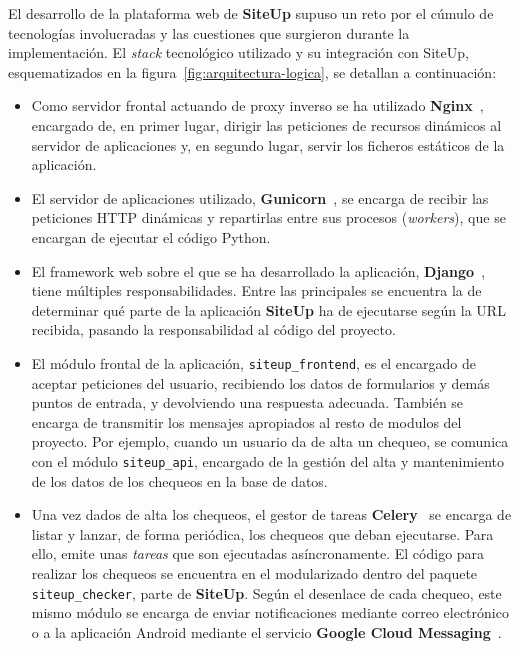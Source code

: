 \documentclass[a4paper,12pt]{article}
\begin{document}
El desarrollo de la plataforma web de \textbf{SiteUp} supuso un reto por el
cúmulo de tecnologías involucradas y las cuestiones que surgieron durante la
implementación. El \textit{stack} tecnológico utilizado y su integración con
SiteUp, esquematizados en la figura~\ref{fig:arquitectura-logica}, se detallan a
continuación:

\begin{itemize}
\item Como servidor frontal actuando de proxy inverso se ha utilizado
  \textbf{Nginx}~\cite{nginx}, encargado de, en primer lugar, dirigir las peticiones de
  recursos dinámicos al servidor de aplicaciones y, en segundo lugar, servir los
  ficheros estáticos de la aplicación.

\item El servidor de aplicaciones utilizado, \textbf{Gunicorn}~\cite{gunicorn},
  se encarga de recibir las peticiones HTTP dinámicas y repartirlas entre sus
  procesos (\textit{workers}), que se encargan de ejecutar el código Python.

\item El framework web sobre el que se ha desarrollado la aplicación,
  \textbf{Django}~\cite{django}, tiene múltiples responsabilidades. Entre las
  principales se encuentra la de determinar qué parte de la aplicación
  \textbf{SiteUp} ha de ejecutarse según la URL recibida, pasando la
  responsabilidad al código del proyecto.

\item El módulo frontal de la aplicación, \texttt{siteup\_frontend}, es el
  encargado de aceptar peticiones del usuario, recibiendo los datos de
  formularios y demás puntos de entrada, y devolviendo una respuesta
  adecuada. También se encarga de transmitir los mensajes apropiados al resto de
  modulos del proyecto. Por ejemplo, cuando un usuario da de alta un chequeo, se
  comunica con el módulo \texttt{siteup\_api}, encargado de la gestión del alta
  y mantenimiento de los datos de los chequeos en la base de datos. 

\item Una vez dados de alta los chequeos, el gestor de tareas
  \textbf{Celery}~\cite{celery} se encarga de listar y lanzar, de forma
  periódica, los chequeos que deban ejecutarse. Para ello, emite unas
  \textit{tareas} que son ejecutadas asíncronamente. El código para realizar los
  chequeos se encuentra en el modularizado dentro del paquete
  \texttt{siteup\_checker}, parte de \textbf{SiteUp}. Según el desenlace de cada
  chequeo, este mismo módulo se encarga de enviar notificaciones mediante correo
  electrónico o a la aplicación Android mediante el servicio \textbf{Google
    Cloud Messaging}~\cite{gcm}.

\end{itemize}
\end{document}
